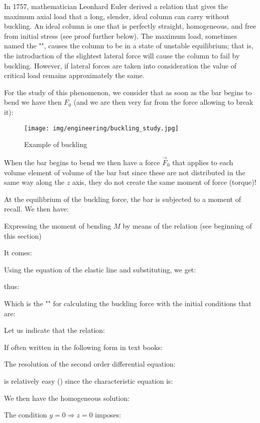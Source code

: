 	In 1757, mathematician Leonhard Euler derived a relation that gives the maximum axial load that a long, slender, ideal column can carry without buckling. An ideal column is one that is perfectly straight, homogeneous, and free from initial stress (see proof further below). The maximum load, sometimes named the "", causes the column to be in a state of unstable equilibrium; that is, the introduction of the slightest lateral force will cause the column to fail by buckling. However, if lateral forces are taken into consideration the value of critical load remains approximately the same.

	For the study of this phenomenon, we consider that as soon as the bar begins to bend we have then $F_0$ (and we are then very far from the force allowing to break it):
	\begin{figure}[H]
		\centering
		\texttt{[image: img/engineering/buckling\_study.jpg]}
		\caption{Example of buckling}
	\end{figure}
	When the bar begins to bend we then have a force $\vec{F}_0$ that applies to each volume element of volume of the bar but since these are not distributed in the same way along the $z$ axis, they do not create the same moment of force (torque)!

	At the equilibrium of the buckling force, the bar is subjected to a moment of recall. We then have:
	
	Expressing the moment of bending $M$ by means of the relation (see beginning of this section)
	
	It comes:
	
	Using the equation of the elastic line and substituting, we get:	
	
	thus:
	
	Which is the "" for calculating the buckling force with the initial conditions that are:
	
	Let us indicate that the relation:
	
	If often written in the following form in text books:
	
	The resolution of the second order differential equation:
	
	is relatively easy () since the characteristic equation is:
	
	We then have the homogeneous solution:
	
	The condition  $y=0\Rightarrow z=0$ imposes:
	

